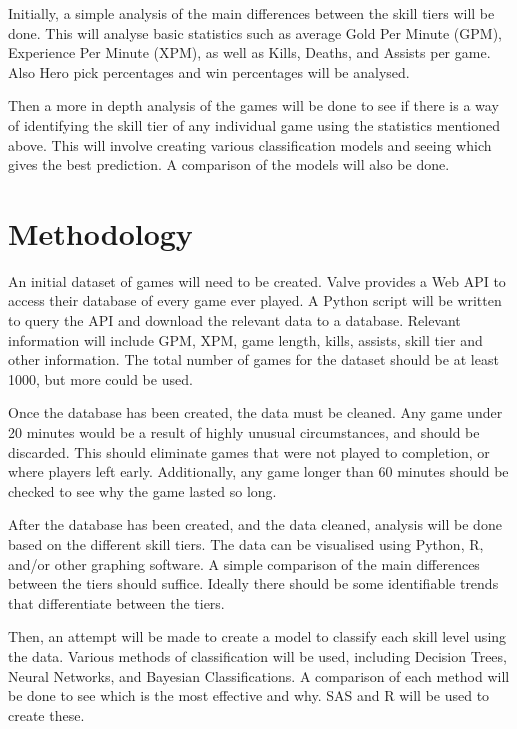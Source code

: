 \documentclass[11pt]{article}
\begin{document}
Initially, a simple analysis of the main differences between the skill tiers will be done. This will analyse basic statistics such as average Gold Per Minute (GPM), Experience Per Minute (XPM), as well as Kills, Deaths, and Assists per game. Also Hero pick percentages and win percentages will be analysed.

\vspace{2mm}

Then a more in depth analysis of the games will be done to see if there is a way of identifying the skill tier of any individual game using the statistics mentioned above. This will involve creating  various classification models and seeing which gives the best prediction. A comparison of the models will also be done.

\section{Methodology}
An initial dataset of games will need to be created. Valve provides a Web API to access their database of every game ever played. A Python script will be written to query the API and download the relevant data to a database. Relevant information will include GPM, XPM, game length, kills, assists, skill tier and other information. The total number of games for the dataset should be at least 1000, but more could be used.

\vspace{2mm}

Once the database has been created, the data must be cleaned. Any game under 20 minutes would be a result of highly unusual circumstances, and should be discarded. This should eliminate games that were not played to completion, or where players left early. Additionally, any game longer than 60 minutes should be checked to see why the game lasted so long.

\vspace{2mm}

After the database has been created, and the data cleaned, analysis will be done based on the different skill tiers. The data can be visualised using Python, R, and/or other graphing software. A simple comparison of the main differences between the tiers should suffice. Ideally there should be some identifiable trends that differentiate between the tiers.

\vspace{2mm}

Then, an attempt will be made to create a model to classify each skill level using the data. Various methods of classification will be used, including Decision Trees, Neural Networks, and Bayesian Classifications. A comparison of each method will be done to see which is the most effective and why. SAS and R will be used to create these.
\end{document}
